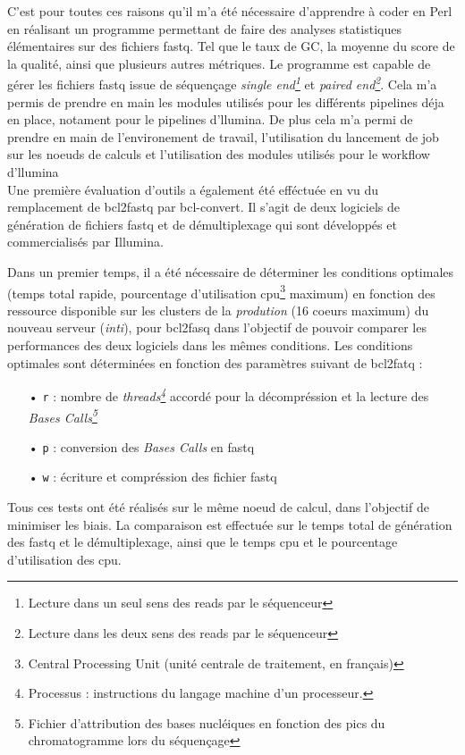 {{C'est pour toutes ces raisons qu'il m'a été nécessaire d'apprendre à coder en Perl en réalisant un programme permettant de faire des analyses statistiques élémentaires sur des fichiers fastq. Tel que le taux de GC, la moyenne du score de la qualité, ainsi que plusieurs autres métriques. Le programme est capable de gérer les fichiers fastq issue de séquençage \emph{single end\footnote{Lecture dans un seul sens des reads par le séquenceur}} et \emph{paired end\footnote{Lecture dans les deux sens des reads par le séquenceur}}. Cela m'a permis de prendre en main les modules utilisés pour les différents pipelines déja en place, notament pour le pipelines d'llumina. De plus cela m'a permi de prendre en main de l'environement de travail, l'utilisation du lancement de job sur les noeuds de calculs et l'utilisation des modules utilisés pour le workflow d'llumina\\

Une première évaluation d'outils a également été efféctuée en vu du remplacement de bcl2fastq par bcl-convert. Il s'agit de deux logiciels de génération de fichiers fastq et de démultiplexage qui sont développés et commercialisés par Illumina.

Dans un premier temps, il a été nécessaire de déterminer les conditions optimales (temps total rapide, pourcentage d'utilisation cpu\footnote{Central Processing Unit (unité centrale de traitement, en français)} maximum) en fonction des ressource disponible sur les clusters de la \emph{prodution} (16 coeurs maximum) du nouveau serveur (\emph{inti}), pour bcl2fasq dans l'objectif de pouvoir comparer les performances des deux logiciels dans les mêmes conditions. Les conditions optimales sont déterminées en fonction des paramètres suivant de bcl2fatq : 
\begin{itemize}
    \item[•] \texttt{r} : nombre de \emph{threads\footnote{Processus : instructions du langage machine d'un processeur.}} accordé pour la décompréssion et la lecture des \emph{Bases Calls\footnote{Fichier d'attribution des bases nucléiques en fonction des pics du chromatogramme lors du séquençage}}
    \item[•] \texttt{p} : conversion des \emph{Bases Calls} en fastq
    \item[•] \texttt{w} : écriture et compréssion des fichier fastq
\end{itemize}

Tous ces tests ont été  réalisés sur le même noeud de calcul, dans l'objectif de minimiser les biais. La comparaison est effectuée sur le temps total de génération des fastq et le démultiplexage, ainsi que le temps cpu et le pourcentage d'utilisation des cpu.

}}
